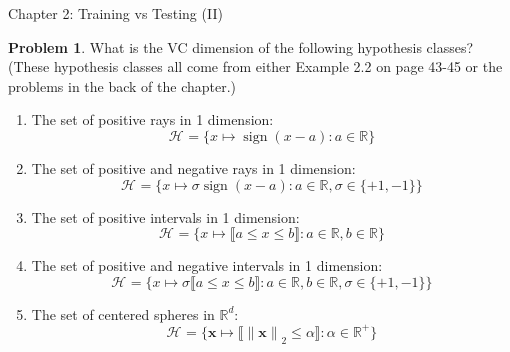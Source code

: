\documentclass[10pt]{exam}
\theoremstyle{definition}
\newtheorem{problem}{Problem}
\newcommand{\R}{\mathbb R}
\DeclareMathOperator{\sign}{sign}
\newcommand{\x}{\mathbf x}
\newcommand{\ltwo}[1]{{\lVert {#1} \rVert}_2}
\newcommand{\HH}[1]{\mathcal H_{\text{#1}}}
\begin{document}
\begin{center}
{
\Huge
Chapter 2: Training vs Testing (II)
}
\end{center}

\begin{center}
\end{center}


\begin{problem}
    What is the VC dimension of the following hypothesis classes?
    (These hypothesis classes all come from either Example 2.2 on page 43-45 or the problems in the back of the chapter.)

    \begin{enumerate}
    \item
        The set of positive rays in 1 dimension:
        \begin{equation}
            \HH{} = \bigg\{ x \mapsto \sign(x-a) : a \in \R \bigg\}
        \end{equation}
            \vspace{3in}

    \item
        The set of positive and negative rays in 1 dimension:
        \begin{equation}
            \HH{} = \bigg\{ x \mapsto \sigma\sign(x-a) : a \in \R, \sigma \in \{+1, -1\} \bigg\}
        \end{equation}
            \vspace{3in}

    \item The set of positive intervals in 1 dimension:
        \begin{equation}
            \HH{} = \bigg\{ x \mapsto \big\llbracket a \le x \le b \big\rrbracket : a \in \R, b \in \R \bigg\}
        \end{equation}
\vspace{4in}

    \item The set of positive and negative intervals in 1 dimension:
        \begin{equation}
            \HH{} = \bigg\{ x \mapsto \sigma \big\llbracket a \le x \le b \big\rrbracket : a \in \R, b \in \R, \sigma \in \{+1, -1\}  \bigg\}
        \end{equation}
\vspace{4in}

    \item The set of centered spheres in $\R^d$:
        \begin{equation}
            \HH{} = \bigg\{ \x \mapsto \big\llbracket \ltwo{\x} \le \alpha \big\rrbracket : \alpha \in \R^+ \bigg\}
        \end{equation}
\vspace{4in}


\end{enumerate}
\end{problem}
\end{document}
